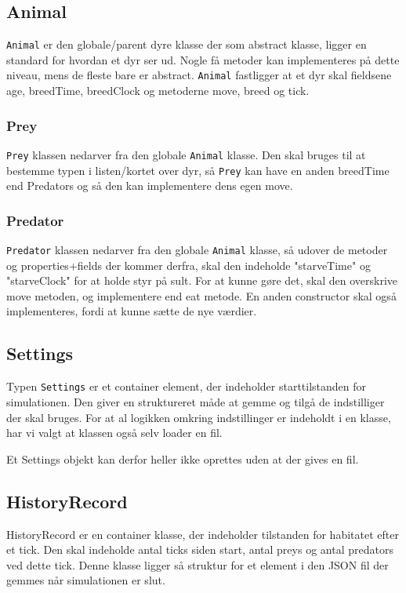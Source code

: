 \documentclass[a4paper]{article}
\begin{document}
    \subsection*{Animal}
      \texttt{Animal} er den globale/parent dyre klasse der som abstract klasse,
      ligger en standard for hvordan et dyr ser ud.
      Nogle få metoder kan implementeres på dette niveau, mens de fleste bare er abstract.
      \texttt{Animal} fastligger at et dyr skal fieldsene age, breedTime, breedClock
      og metoderne move, breed og tick.

      \subsubsection*{Prey}
        \texttt{Prey} klassen nedarver fra den globale \texttt{Animal} klasse.
        Den skal bruges til at bestemme typen i listen/kortet over dyr,
        så \texttt{Prey} kan have en anden breedTime end Predators og så den kan implementere dens egen move.

      \subsubsection*{Predator}
        \texttt{Predator} klassen nedarver fra den globale \texttt{Animal} klasse,
        så udover de metoder og properties+fields der kommer derfra, skal den indeholde "starveTime"
        og "starveClock" for at holde styr på sult. For at kunne gøre det, skal den overskrive move metoden,
        og implementere end eat metode. En anden constructor skal også implementeres, fordi at kunne sætte de nye værdier.

    \subsection*{Settings} \label{ssec:designSettings}
      Typen \texttt{Settings} er et container element, 
      der indeholder starttilstanden for simulationen.
      Den giver en struktureret måde at gemme og tilgå de indstilliger der skal bruges.
      For at al logikken omkring indstillinger er indeholdt i en klasse,
      har vi valgt at klassen også selv loader en fil.

      Et Settings objekt kan derfor heller ikke oprettes uden at der gives en fil.

    \subsection*{HistoryRecord}
      HistoryRecord er en container klasse, der indeholder tilstanden for habitatet efter et tick.
      Den skal indeholde antal ticks siden start, antal preys og antal predators ved dette tick.
      Denne klasse ligger så struktur for et element i den JSON fil der gemmes når simulationen er slut.
\end{document}
